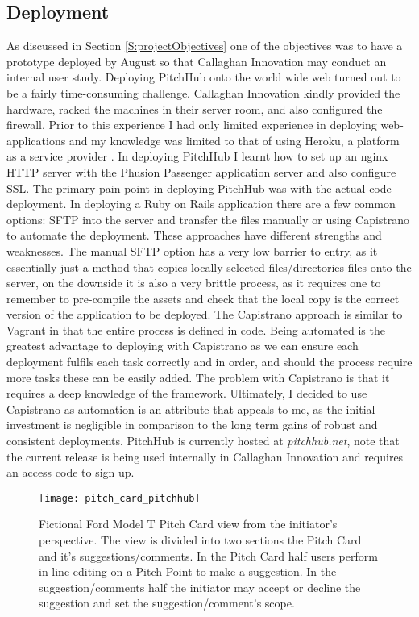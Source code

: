 \subsection{Deployment}
As discussed in Section \ref{S:projectObjectives} one of the objectives was to have a prototype deployed by August so that Callaghan Innovation may conduct an internal user study. Deploying PitchHub onto the world wide web turned out to be a fairly time-consuming challenge. Callaghan Innovation kindly provided the hardware, racked the machines in their server room, and also configured the firewall. Prior to this experience I had only limited experience in deploying web-applications and my knowledge was limited to that of using Heroku, a platform as a service provider \cite{Herok1:online}. In deploying PitchHub I learnt how to set up an nginx HTTP server \cite{nginx2:online} with the Phusion Passenger application server \cite{phusionPassenger:online} and also configure SSL. The primary pain point in deploying PitchHub was with the actual code deployment. In deploying a Ruby on Rails application there are a few common options: SFTP into the server and transfer the files manually or using Capistrano \cite{capistrano:online} to automate the deployment. These approaches have different strengths and weaknesses. The manual SFTP option has a very low barrier to entry, as it essentially just a method that copies locally selected files/directories files onto the server, on the downside it is also a very brittle process, as it requires one to remember to pre-compile the assets and check that the local copy is the correct version of the application to be deployed. The Capistrano approach is similar to Vagrant in that the entire process is defined in code. Being automated is the greatest advantage to deploying with Capistrano as we can ensure each deployment fulfils each task correctly and in order, and should the process require more tasks these can be easily added. The problem with Capistrano is that it requires a deep knowledge of the framework. Ultimately, I decided to use Capistrano as automation is an attribute that appeals to me, as the initial investment is negligible in comparison to the long term gains of robust and consistent deployments. PitchHub is currently hosted at \textit{pitchhub.net}, note that the current release is being used internally in Callaghan Innovation and requires an access code to sign up.

\begin{sidewaysfigure}[ht]
    \centering
    \texttt{[image: pitch\_card\_pitchhub]}
    \caption{Fictional Ford Model T Pitch Card view from the initiator's perspective. The view is divided into two sections the Pitch Card and it's suggestions/comments. In the Pitch Card half users perform in-line editing on a Pitch Point to make a suggestion. In the suggestion/comments half the initiator may accept or decline the suggestion and set the suggestion/comment's scope.}
    \label{fig:pitch_card_pitchhub}
\end{sidewaysfigure}


